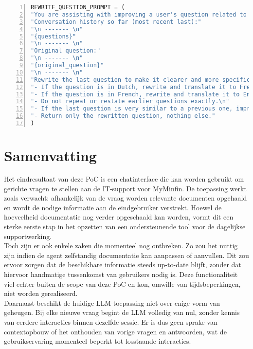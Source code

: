 \begin{lstlisting}[basicstyle=\small, frame=single, breaklines=true, postbreak=\mbox{\textcolor{red}{$\hookrightarrow$}\space}, escapeinside ={\%,}, escapechar={!}, numbers=left, language=Python, caption=Beoordeling documenten prompt]
REWRITE_QUESTION_PROMPT = (
"You are assisting with improving a user's question related to Myminfin IT-support.\n"
"Conversation history so far (most recent last):"
"\n ------- \n"
"{questions}"
"\n ------- \n"
"Original question:"
"\n ------- \n"
"{original_question}"
"\n ------- \n"
"Rewrite the last question to make it clearer and more specific, without changing its original meaning or intent.\n"
"- If the question is in Dutch, rewrite and translate it to French.\n"
"- If the question is in French, rewrite and translate it to English.\n"
"- Do not repeat or restate earlier questions exactly.\n"
"- If the last question is very similar to a previous one, improve it by adding useful clarifications or context relevant to Myminfin IT-support.\n"
"- Return only the rewritten question, nothing else."
)
\end{lstlisting}
\section{Samenvatting}


Het eindresultaat van deze PoC is een chatinterface die kan worden gebruikt om gerichte vragen te stellen aan de IT-support voor MyMinfin. De toepassing werkt zoals verwacht: afhankelijk van de vraag worden relevante documenten opgehaald en wordt de nodige informatie aan de eindgebruiker verstrekt. Hoewel de hoeveelheid documentatie nog verder opgeschaald kan worden, vormt dit een sterke eerste stap in het opzetten van een ondersteunende tool voor de dagelijkse supportwerking.
\\[1em]
Toch zijn er ook enkele zaken die momenteel nog ontbreken. Zo zou het nuttig zijn indien de agent zelfstandig documentatie kan aanpassen of aanvullen. Dit zou ervoor zorgen dat de beschikbare informatie steeds up-to-date blijft, zonder dat hiervoor handmatige tussenkomst van gebruikers nodig is. Deze functionaliteit viel echter buiten de scope van deze PoC en kon, omwille van tijdsbeperkingen, niet worden gerealiseerd.
\\[1em]
Daarnaast beschikt de huidige LLM-toepassing niet over enige vorm van geheugen. Bij elke nieuwe vraag begint de LLM volledig van nul, zonder kennis van eerdere interacties binnen dezelfde sessie. Er is dus geen sprake van contextopbouw of het onthouden van vorige vragen en antwoorden, wat de gebruikservaring momenteel beperkt tot losstaande interacties.